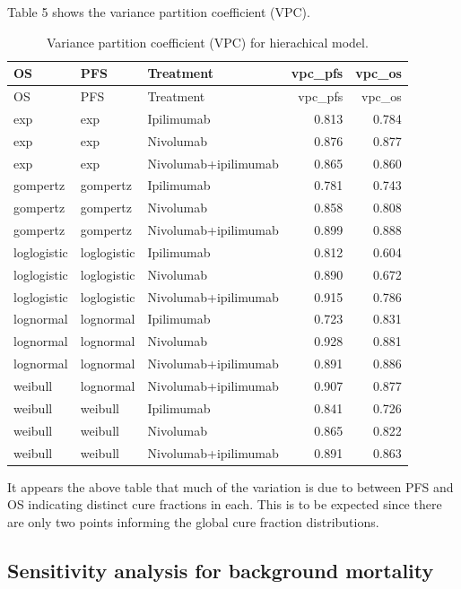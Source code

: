 \documentclass[
]{article}
\begin{document}
Table 5 shows the variance partition coefficient (VPC).

\begin{longtable}[]{@{}lllrr@{}}
\caption{Variance partition coefficient (VPC) for hierachical
model.}\tabularnewline
\toprule
OS & PFS & Treatment & vpc\_pfs & vpc\_os \\
\midrule
\endfirsthead
\toprule
OS & PFS & Treatment & vpc\_pfs & vpc\_os \\
\midrule
\endhead
exp & exp & Ipilimumab & 0.813 & 0.784 \\
exp & exp & Nivolumab & 0.876 & 0.877 \\
exp & exp & Nivolumab+ipilimumab & 0.865 & 0.860 \\
gompertz & gompertz & Ipilimumab & 0.781 & 0.743 \\
gompertz & gompertz & Nivolumab & 0.858 & 0.808 \\
gompertz & gompertz & Nivolumab+ipilimumab & 0.899 & 0.888 \\
loglogistic & loglogistic & Ipilimumab & 0.812 & 0.604 \\
loglogistic & loglogistic & Nivolumab & 0.890 & 0.672 \\
loglogistic & loglogistic & Nivolumab+ipilimumab & 0.915 & 0.786 \\
lognormal & lognormal & Ipilimumab & 0.723 & 0.831 \\
lognormal & lognormal & Nivolumab & 0.928 & 0.881 \\
lognormal & lognormal & Nivolumab+ipilimumab & 0.891 & 0.886 \\
weibull & lognormal & Nivolumab+ipilimumab & 0.907 & 0.877 \\
weibull & weibull & Ipilimumab & 0.841 & 0.726 \\
weibull & weibull & Nivolumab & 0.865 & 0.822 \\
weibull & weibull & Nivolumab+ipilimumab & 0.891 & 0.863 \\
\bottomrule
\end{longtable}

It appears the above table that much of the variation is due to between
PFS and OS indicating distinct cure fractions in each. This is to be
expected since there are only two points informing the global cure
fraction distributions.

\hypertarget{sensitivity-analysis-for-background-mortality}{%
\subsection{Sensitivity analysis for background
mortality}\label{sensitivity-analysis-for-background-mortality}}
\end{document}
